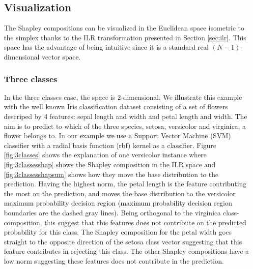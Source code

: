 \documentclass{article}
\theoremstyle{plain}
\theoremstyle{definition}
\theoremstyle{remark}
\begin{document}
\subsection{Visualization}

The Shapley compositions can be visualized in the Euclidean space isometric to the simplex thanks to the ILR transformation presented in Section \ref{sec:ilr}. This space has the advantage of being intuitive since it is a standard real $(N-1)$-dimensional vector space.

\subsubsection{Three classes}

In the three classes case, the space is $2$-dimensional. We illustrate this example with the well known Iris classification dataset consisting of a set of flowers descriped by 4 features: sepal length and width and petal length and width. The aim is to predict to which of the three species, setosa, versicolor and virginica, a flower belongs to. In our example we use a Support Vector Machine (SVM) classifier with a radial basis function (rbf) kernel as a classifier. Figure \ref{fig:3classes} shows the explanation of one versicolor instance where \ref{fig:3classesshap} shows the Shapley composition in the ILR space and \ref{fig:3classesshapsum} shows how they move the base distribution to the prediction. Having the highest norm, the petal length is the feature contributing the most on the prediction, and moves the base distribution to the versicolor maximum probability decision region (maximum probability decision region boundaries are the dashed gray lines). Being orthogonal to the virginica class-composition, this suggest that this features does not contribute on the predicted probability for this class. The Shapley composition for the petal width goes straight to the opposite direction of the setosa class vector suggesting that this feature contributes in rejecting this class. The other Shapley compositions have a low norm suggesting these features does not contribute in the prediction.
\end{document}

